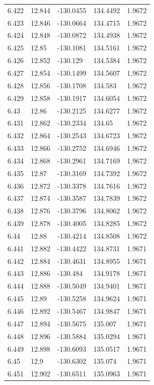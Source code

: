 \begin{tabular}{lllll}
6.422 & 12.844 & -130.0455 & 134.4492 & 1.9672 \\
6.423 & 12.846 & -130.0664 & 134.4715 & 1.9672 \\
6.424 & 12.848 & -130.0872 & 134.4938 & 1.9672 \\
6.425 & 12.85 & -130.1081 & 134.5161 & 1.9672 \\
6.426 & 12.852 & -130.129 & 134.5384 & 1.9672 \\
6.427 & 12.854 & -130.1499 & 134.5607 & 1.9672 \\
6.428 & 12.856 & -130.1708 & 134.583 & 1.9672 \\
6.429 & 12.858 & -130.1917 & 134.6054 & 1.9672 \\
6.43 & 12.86 & -130.2125 & 134.6277 & 1.9672 \\
6.431 & 12.862 & -130.2334 & 134.65 & 1.9672 \\
6.432 & 12.864 & -130.2543 & 134.6723 & 1.9672 \\
6.433 & 12.866 & -130.2752 & 134.6946 & 1.9672 \\
6.434 & 12.868 & -130.2961 & 134.7169 & 1.9672 \\
6.435 & 12.87 & -130.3169 & 134.7392 & 1.9672 \\
6.436 & 12.872 & -130.3378 & 134.7616 & 1.9672 \\
6.437 & 12.874 & -130.3587 & 134.7839 & 1.9672 \\
6.438 & 12.876 & -130.3796 & 134.8062 & 1.9672 \\
6.439 & 12.878 & -130.4005 & 134.8285 & 1.9672 \\
6.44 & 12.88 & -130.4214 & 134.8508 & 1.9672 \\
6.441 & 12.882 & -130.4422 & 134.8731 & 1.9671 \\
6.442 & 12.884 & -130.4631 & 134.8955 & 1.9671 \\
6.443 & 12.886 & -130.484 & 134.9178 & 1.9671 \\
6.444 & 12.888 & -130.5049 & 134.9401 & 1.9671 \\
6.445 & 12.89 & -130.5258 & 134.9624 & 1.9671 \\
6.446 & 12.892 & -130.5467 & 134.9847 & 1.9671 \\
6.447 & 12.894 & -130.5675 & 135.007 & 1.9671 \\
6.448 & 12.896 & -130.5884 & 135.0294 & 1.9671 \\
6.449 & 12.898 & -130.6093 & 135.0517 & 1.9671 \\
6.45 & 12.9 & -130.6302 & 135.074 & 1.9671 \\
6.451 & 12.902 & -130.6511 & 135.0963 & 1.9671 \\

\end{tabular}
